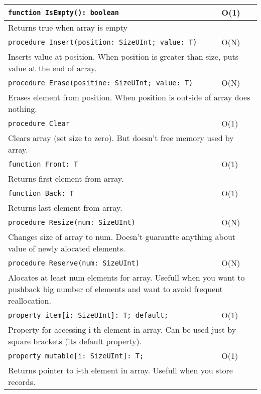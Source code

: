 \begin{longtable}{|m{10cm}|m{5cm}|}
\verb!function IsEmpty(): boolean! & O(1) \\ \hline
\multicolumn{2}{|m{15cm}|}{Returns true when array is empty} \\\hline\hline

\verb!procedure Insert(position: SizeUInt; value: T)! & O(N) \\\hline
\multicolumn{2}{|m{15cm}|}{Inserts value at position. When position is greater than size, puts value
at the end of array.} \\\hline\hline

\verb!procedure Erase(positine: SizeUInt; value: T)! & O(N) \\\hline
\multicolumn{2}{|m{15cm}|}{Erases element from position. When position is outside of array does
nothing.} \\\hline\hline

\verb!procedure Clear! & O(1) \\\hline
\multicolumn{2}{|m{15cm}|}{Clears array (set size to zero). But doesn't free memory used by array.}
\\\hline\hline

\verb!function Front: T! & O(1) \\\hline
\multicolumn{2}{|m{15cm}|}{Returns first element from array.} \\\hline\hline

\verb!function Back: T! & O(1) \\\hline
\multicolumn{2}{|m{15cm}|}{Returns last element from array.} \\\hline\hline

\verb!procedure Resize(num: SizeUInt)! & O(N) \\\hline
\multicolumn{2}{|m{15cm}|}{Changes size of array to num. Doesn't guarantte anything about value of
newly alocated elements.} \\\hline\hline

\verb!procedure Reserve(num: SizeUInt)! & O(N) \\\hline
\multicolumn{2}{|m{15cm}|}{Alocates at least num elements for array. Usefull when you want to
pushback big number of elements and want to avoid frequent reallocation.} \\\hline\hline

\verb!property item[i: SizeUInt]: T; default;! & O(1) \\\hline
\multicolumn{2}{|m{15cm}|}{Property for accessing i-th element in array. Can be used just by square
brackets (its default property).} \\\hline\hline

\verb!property mutable[i: SizeUInt]: T;! & O(1) \\\hline
\multicolumn{2}{|m{15cm}|}{Returns pointer to i-th element in array. Usefull when you store records.} \\\hline



\end{longtable}

